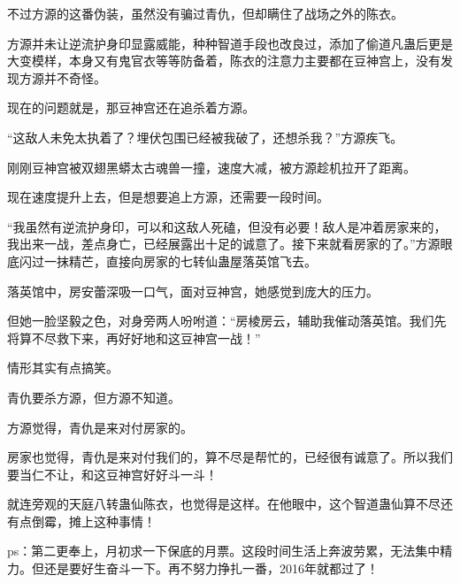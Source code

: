 \begin{this_body}
不过方源的这番伪装，虽然没有骗过青仇，但却瞒住了战场之外的陈衣。

方源并未让逆流护身印显露威能，种种智道手段也改良过，添加了偷道凡蛊后更是大变模样，本身又有鬼官衣等等防备着，陈衣的注意力主要都在豆神宫上，没有发现方源并不奇怪。

现在的问题就是，那豆神宫还在追杀着方源。

“这敌人未免太执着了？埋伏包围已经被我破了，还想杀我？”方源疾飞。

刚刚豆神宫被双翅黑蟒太古魂兽一撞，速度大减，被方源趁机拉开了距离。

现在速度提升上去，但是想要追上方源，还需要一段时间。

“我虽然有逆流护身印，可以和这敌人死磕，但没有必要！敌人是冲着房家来的，我出来一战，差点身亡，已经展露出十足的诚意了。接下来就看房家的了。”方源眼底闪过一抹精芒，直接向房家的七转仙蛊屋落英馆飞去。

落英馆中，房安蕾深吸一口气，面对豆神宫，她感觉到庞大的压力。

但她一脸坚毅之色，对身旁两人吩咐道：“房棱房云，辅助我催动落英馆。我们先将算不尽救下来，再好好地和这豆神宫一战！”

情形其实有点搞笑。

青仇要杀方源，但方源不知道。

方源觉得，青仇是来对付房家的。

房家也觉得，青仇是来对付我们的，算不尽是帮忙的，已经很有诚意了。所以我们要当仁不让，和这豆神宫好好斗一斗！

就连旁观的天庭八转蛊仙陈衣，也觉得是这样。在他眼中，这个智道蛊仙算不尽还有点倒霉，摊上这种事情！

ps：第二更奉上，月初求一下保底的月票。这段时间生活上奔波劳累，无法集中精力。但还是要好生奋斗一下。再不努力挣扎一番，2016年就都过了！

\end{this_body}

